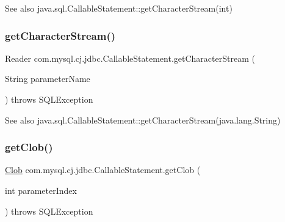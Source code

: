 \begin{DoxySeeAlso}{See also}
java.\+sql.\+Callable\+Statement\+::get\+Character\+Stream(int) 
\end{DoxySeeAlso}
\mbox{\label{classcom_1_1mysql_1_1cj_1_1jdbc_1_1_callable_statement_a5477c18b65f62729d34075e638b5e6de}} 
\subsubsection{\texorpdfstring{get\+Character\+Stream()}{getCharacterStream()}\hspace{0.1cm}{\footnotesize\ttfamily [2/2]}}
{\footnotesize\ttfamily Reader com.\+mysql.\+cj.\+jdbc.\+Callable\+Statement.\+get\+Character\+Stream (\begin{DoxyParamCaption}\item[{String}]{parameter\+Name }\end{DoxyParamCaption}) throws S\+Q\+L\+Exception}

\begin{DoxySeeAlso}{See also}
java.\+sql.\+Callable\+Statement\+::get\+Character\+Stream(java.\+lang.\+String) 
\end{DoxySeeAlso}
\mbox{\label{classcom_1_1mysql_1_1cj_1_1jdbc_1_1_callable_statement_a24eab53dc2c5d9c0ca81d4ef1f9c4a68}} 
\subsubsection{\texorpdfstring{get\+Clob()}{getClob()}\hspace{0.1cm}{\footnotesize\ttfamily [1/2]}}
{\footnotesize\ttfamily \mbox{\hyperlink{classcom_1_1mysql_1_1cj_1_1jdbc_1_1_clob}{Clob}} com.\+mysql.\+cj.\+jdbc.\+Callable\+Statement.\+get\+Clob (\begin{DoxyParamCaption}\item[{int}]{parameter\+Index }\end{DoxyParamCaption}) throws S\+Q\+L\+Exception}

